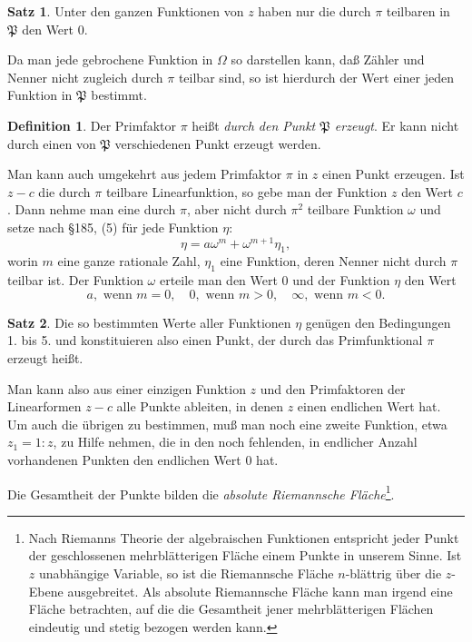\documentclass[12pt,a4paper]{article}
\theoremstyle{definition}
\newtheorem{defin}{Definition}[section]
\newtheorem{satz}{Satz}[section]
\begin{document}
\begin{satz}
Unter den ganzen Funktionen von $z$ haben nur die durch $\pi$ teilbaren in $\mathfrak{P}$ den Wert $0$.
\end{satz}

Da man jede gebrochene Funktion in $\Omega$ so darstellen kann, daß Zähler und Nenner nicht zugleich durch $\pi$ teilbar sind, so ist hierdurch der Wert einer jeden Funktion in $\mathfrak{P}$ bestimmt.

\begin{defin}
Der Primfaktor $\pi$ heißt \emph{durch den Punkt $\mathfrak{P}$ erzeugt}. Er kann nicht durch einen von $\mathfrak{P}$ verschiedenen Punkt erzeugt werden.
\end{defin}

Man kann auch umgekehrt aus jedem Primfaktor $\pi$ in $z$ einen Punkt erzeugen. Ist $z - c$ die durch $\pi$ teilbare Linearfunktion, so gebe man der Funktion $z$ den Wert $c$. Dann nehme man eine durch $\pi$, aber nicht durch $\pi^2$ teilbare Funktion $\omega$ und setze nach \S 185, (5) für jede Funktion $\eta$:
\begin{equation}
\eta = a\omega^m + \omega^{m+1}\eta_1,
\end{equation}
worin $m$ eine ganze rationale Zahl, $\eta_1$ eine Funktion, deren Nenner nicht durch $\pi$ teilbar ist. Der Funktion $\omega$ erteile man den Wert $0$ und der Funktion $\eta$ den Wert
\[
a, \text{ wenn } m = 0, \quad
0, \text{ wenn } m > 0, \quad
\infty, \text{ wenn } m < 0.
\]

\begin{satz}
Die so bestimmten Werte aller Funktionen $\eta$ genügen den Bedingungen 1. bis 5. und konstituieren also einen Punkt, der durch das Primfunktional $\pi$ erzeugt heißt.
\end{satz}

Man kann also aus einer einzigen Funktion $z$ und den Primfaktoren der Linearformen $z - c$ alle Punkte ableiten, in denen $z$ einen endlichen Wert hat. Um auch die übrigen zu bestimmen, muß man noch eine zweite Funktion, etwa $z_1 = 1:z$, zu Hilfe nehmen, die in den noch fehlenden, in endlicher Anzahl vorhandenen Punkten den endlichen Wert $0$ hat.

Die Gesamtheit der Punkte bilden die \emph{absolute Riemannsche Fläche}\footnote{Nach Riemanns Theorie der algebraischen Funktionen entspricht jeder Punkt der geschlossenen mehrblätterigen Fläche einem Punkte in unserem Sinne. Ist $z$ unabhängige Variable, so ist die Riemannsche Fläche $n$-blättrig über die $z$-Ebene ausgebreitet. Als absolute Riemannsche Fläche kann man irgend eine Fläche betrachten, auf die die Gesamtheit jener mehrblätterigen Flächen eindeutig und stetig bezogen werden kann.}.
\end{document}
